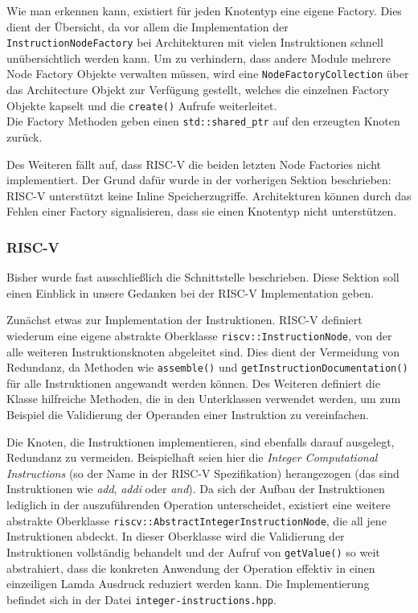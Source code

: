Wie man erkennen kann, existiert für jeden Knotentyp eine eigene Factory. Dies
dient der Übersicht, da vor allem die Implementation der
\texttt{InstructionNodeFactory} bei Architekturen mit vielen Instruktionen
schnell unübersichtlich werden kann. Um zu verhindern, dass andere Module
mehrere Node Factory Objekte verwalten müssen, wird eine
\texttt{NodeFactoryCollection} über das Architecture Objekt zur Verfügung
gestellt, welches die einzelnen Factory Objekte kapselt und die
\texttt{create()} Aufrufe weiterleitet. \\
Die Factory Methoden geben einen \texttt{std::shared\_ptr} auf den erzeugten
Knoten zurück.

Des Weiteren fällt auf, dass RISC-V die beiden letzten Node Factories nicht
implementiert. Der Grund dafür wurde in der vorherigen Sektion beschrieben:
RISC-V unterstützt keine Inline Speicherzugriffe. Architekturen können durch das
Fehlen einer Factory signalisieren, dass sie einen Knotentyp nicht unterstützen.

\subsubsection{RISC-V}

Bisher wurde fast ausschließlich die Schnittstelle beschrieben. Diese Sektion
soll einen Einblick in unsere Gedanken bei der RISC-V Implementation geben.

Zunächst etwas zur Implementation der Instruktionen. RISC-V definiert wiederum
eine eigene abstrakte Oberklasse \texttt{riscv::InstructionNode}, von der alle
weiteren Instruktionsknoten abgeleitet sind. Dies dient der Vermeidung von
Redundanz, da Methoden wie \texttt{assemble()} und
\texttt{getInstructionDocumentation()} für alle Instruktionen angewandt werden
können. Des Weiteren definiert die Klasse hilfreiche Methoden, die in den
Unterklassen verwendet werden, um zum Beispiel die Validierung der Operanden
einer Instruktion zu vereinfachen.

Die Knoten, die Instruktionen implementieren, sind ebenfalls darauf ausgelegt,
Redundanz zu vermeiden. Beispielhaft seien hier die \emph{Integer
Computational Instructions} (so der Name in der RISC-V Spezifikation)
herangezogen (das sind Instruktionen wie \emph{add}, \emph{addi} oder
\emph{and}). Da sich der Aufbau der Instruktionen lediglich in der
auszuführenden Operation unterscheidet, existiert eine weitere abstrakte
Oberklasse \texttt{riscv::AbstractIntegerInstructionNode}, die all jene
Instruktionen abdeckt. In dieser Oberklasse wird die Validierung der
Instruktionen vollständig behandelt und der Aufruf von \texttt{getValue()} so
weit abstrahiert, dass die konkreten Anwendung der Operation effektiv in einen
einzeiligen Lamda Ausdruck reduziert werden kann. Die Implementierung befindet
sich in der Datei \texttt{integer-instructions.hpp}.

